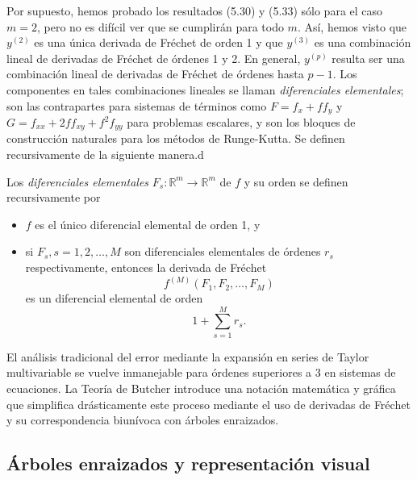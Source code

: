 Por supuesto, hemos probado los resultados (5.30) y (5.33) sólo para el caso $m = 2$, pero no es difícil ver que se cumplirán para todo $m$. Así, hemos visto que $y^{(2)}$ es una única derivada de Fréchet de orden 1 y que $y^{(3)}$ es una combinación lineal de derivadas de Fréchet de órdenes 1 y 2. En general, $y^{(p)}$ resulta ser una combinación lineal de derivadas de Fréchet de órdenes hasta $p - 1$. Los componentes en tales combinaciones lineales se llaman \textit{diferenciales elementales}; son las contrapartes para sistemas de términos como $F=f_x+ff_y$ y $G=f_{xx}+2ff_{xy}+f^2 f_{yy}$  para problemas escalares, y son los bloques de construcción naturales para los métodos de Runge-Kutta. Se definen recursivamente de la siguiente manera.d
\begin{defi} Los \textit{diferenciales elementales} $F_s : \mathbb{R}^m \to \mathbb{R}^m$ de $f$ y su orden se definen recursivamente por
\begin{itemize}
 \item [(i)] $f$ es el único diferencial elemental de orden 1, y 
 \item [(ii)] si $F_s, s = 1, 2, \dots, M$ son diferenciales elementales de órdenes $r_s$ respectivamente, entonces la derivada de Fréchet
\begin{equation*}
f^{(M)}(F_1, F_2, \dots, F_M) \tag{5.34}
\end{equation*}
es un diferencial elemental de orden
\begin{equation*}
1 + \sum_{s=1}^M r_s. \tag{5.35}
\end{equation*}
\end{itemize}
\end{defi}
El análisis tradicional del error mediante la expansión en series de Taylor multivariable se vuelve inmanejable para órdenes superiores a 3 en sistemas de ecuaciones. La Teoría de Butcher introduce una notación matemática y gráfica que simplifica drásticamente este proceso mediante el uso de derivadas de Fréchet y su correspondencia biunívoca con árboles enraizados.
















\subsection{Árboles enraizados y representación visual}

